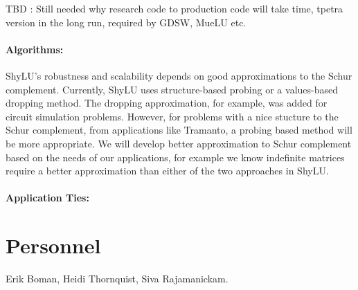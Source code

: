 \documentclass[10pt]{amsart}
\begin{document}
TBD : Still needed why research code to production code will take time, tpetra
version in the long run, required by GDSW, MueLU etc.

\paragraph{\bf{Algorithms}:} ShyLU's robustness and scalability depends on good
approximations to the Schur complement. Currently, ShyLU uses 
structure-based probing
or a values-based dropping method. The dropping approximation, for
example, was added for circuit simulation problems. However, for problems
with a nice stucture to the Schur complement, from applications like Tramanto,
a probing based method will be more appropriate. We will develop better
approximation to Schur complement based on the needs of our applications, for
example we know indefinite matrices require a better approximation than either
of the two approaches in ShyLU.

\paragraph{\bf{Application Ties}:}


\section{Personnel}
Erik Boman, Heidi Thornquist, Siva Rajamanickam.
\end{document}
